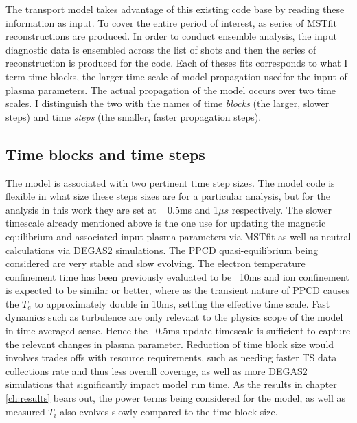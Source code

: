 The transport model takes advantage of this existing code base by reading these information as input. To cover the entire period of interest, as series of MSTfit reconstructions are produced. In order to conduct ensemble analysis, the input diagnostic data is ensembled across the list of shots and then the series of reconstruction is produced for the code. Each of theses fits corresponds to what I term time blocks, the larger time scale of model propagation usedfor the input of plasma parameters. The actual propagation of the model occurs over two time scales. I distinguish the two with the names of time \textit{blocks} (the larger, slower steps) and time \textit{steps} (the smaller, faster propagation steps). 


\subsection{Time blocks and time steps}\label{sec:time_blocks_and_steps}

The model is associated with two pertinent time step sizes. The model code is flexible in what size these steps sizes are for a particular analysis, but for the analysis in this work they are set at ~ 0.5ms and 1$\mu s$ respectively. The slower timescale already mentioned above is the one use for updating the magnetic equilibrium and associated input plasma parameters via MSTfit as well as neutral calculations via DEGAS2 simulations. The PPCD quasi-equilibrium being considered are very stable and slow evolving. The electron temperature confinement time has been previously evaluated to be ~10ms\cite{Chapman2001} and ion confinement is expected to be similar or better, where as the transient nature of PPCD causes the $T_e$ to approximately double in 10ms, setting the effective time scale. Fast dynamics such as turbulence are only relevant to the physics scope of the model in time averaged sense. Hence the ~0.5ms update timescale is sufficient to capture the relevant changes in plasma parameter. Reduction of time block size would involves trades offs with resource requirements, such as needing faster TS data collections rate and thus less overall coverage, as well as more DEGAS2 simulations that significantly impact model run time. As the results in chapter \ref{ch:results} bears out, the power terms being considered for the model, as well as measured $T_i$ also evolves slowly compared to the time block size.

